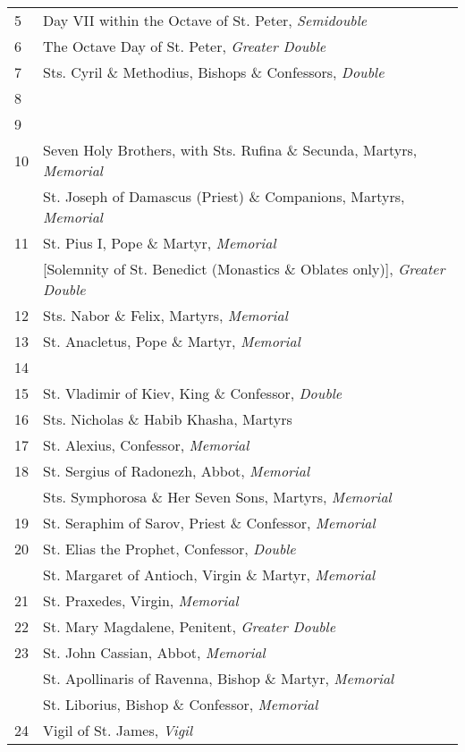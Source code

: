 \begin{longtable}{p{2mm}|p{94mm}}
5&Day VII within the Octave of St. Peter, \textit{Semidouble}\\
6&The Octave Day of St. Peter, \textit{Greater Double}\\
7&Sts. Cyril \& Methodius, Bishops \& Confessors, \textit{Double}\\
8&\\
9&\\
10&Seven Holy Brothers, with Sts. Rufina \& Secunda, Martyrs, \textit{Memorial}\\
&St. Joseph of Damascus (Priest) \& Companions, Martyrs, \textit{Memorial}\\
11&St. Pius I, Pope \& Martyr, \textit{Memorial}\\
&[Solemnity of St. Benedict (Monastics \& Oblates only)], \textit{Greater Double}\\
12&Sts. Nabor \& Felix, Martyrs, \textit{Memorial}\\
13&St. Anacletus, Pope \& Martyr, \textit{Memorial}\\
14&\\
15&St. Vladimir of Kiev, King \& Confessor, \textit{Double}\\
16&Sts. Nicholas \& Habib Khasha, Martyrs\\
17&St. Alexius, Confessor, \textit{Memorial}\\
18&St. Sergius of Radonezh, Abbot, \textit{Memorial}\\
&Sts. Symphorosa \& Her Seven Sons, Martyrs, \textit{Memorial}\\
19&St. Seraphim of Sarov, Priest \& Confessor, \textit{Memorial}\\
20&St. Elias the Prophet, Confessor, \textit{Double}\\
&St. Margaret of Antioch, Virgin \& Martyr, \textit{Memorial}\\
21&St. Praxedes, Virgin, \textit{Memorial}\\
22&{\color{RubricRed}St. Mary Magdalene, Penitent}, \textit{Greater Double}\\
23&St. John Cassian, Abbot, \textit{Memorial}\\
&St. Apollinaris of Ravenna, Bishop \& Martyr, \textit{Memorial}\\
&St. Liborius, Bishop \& Confessor, \textit{Memorial}\\
24&Vigil of St. James, \textit{Vigil}\\

\end{longtable}

